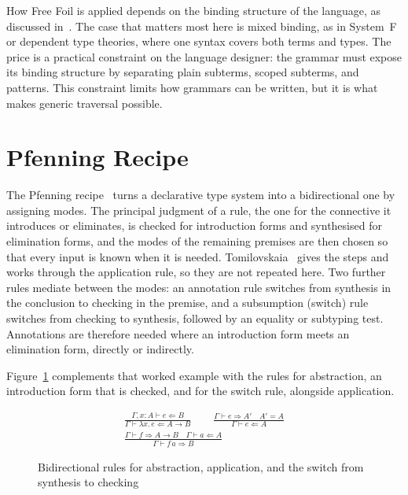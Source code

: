 How Free Foil is applied depends on the binding structure of the language, as discussed in~\cite[Sec.~2.4]{tomilovskaia2025bidir}. The case that matters most here is mixed binding, as in System~F or dependent type theories, where one syntax covers both terms and types. The price is a practical constraint on the language designer: the grammar must expose its binding structure by separating plain subterms, scoped subterms, and patterns. This constraint limits how grammars can be written, but it is what makes generic traversal possible.

\section{Pfenning Recipe}
\label{sec:lr-recipe}

The Pfenning recipe~\cite{dunfield2021bidirectional} turns a declarative type system into a bidirectional one by assigning modes. The principal judgment of a rule, the one for the connective it introduces or eliminates, is checked for introduction forms and synthesised for elimination forms, and the modes of the remaining premises are then chosen so that every input is known when it is needed. Tomilovskaia~\cite[Sec.~2.5]{tomilovskaia2025bidir} gives the steps and works through the application rule, so they are not repeated here. Two further rules mediate between the modes: an annotation rule switches from synthesis in the conclusion to checking in the premise, and a subsumption (switch) rule switches from checking to synthesis, followed by an equality or subtyping test. Annotations are therefore needed where an introduction form meets an elimination form, directly or indirectly.

Figure~\ref{fig:lr-bidir-rules} complements that worked example with the rules for abstraction, an introduction form that is checked, and for the switch rule, alongside application.

\begin{figure}[ht]
\centering
{\Large
\[
\begin{gathered}
\frac{\Gamma, x : A \vdash e \Leftarrow B}{\Gamma \vdash \lambda x.\, e \Leftarrow A \to B}
\qquad
\frac{\Gamma \vdash e \Rightarrow A' \quad A' = A}{\Gamma \vdash e \Leftarrow A}
\\[1.8ex]
\frac{\Gamma \vdash f \Rightarrow A \to B \quad \Gamma \vdash a \Leftarrow A}{\Gamma \vdash f\, a \Rightarrow B}
\end{gathered}
\]
}
\caption{Bidirectional rules for abstraction, application, and the switch from synthesis to checking}
\label{fig:lr-bidir-rules}
\end{figure}


